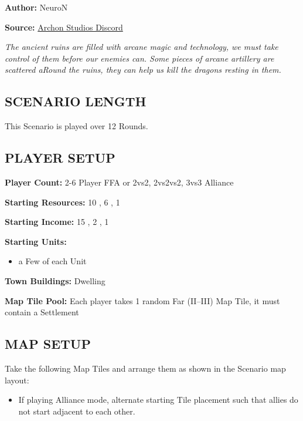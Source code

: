 
\begin{multicols}{2}

\textbf{Author:} NeuroN

\textbf{Source:} \href{https://discord.com/channels/740870068178649108/1279029213839626313}{Archon Studios Discord}

\textit{The ancient ruins are filled with arcane magic and technology, we must take control of them before our enemies can.
Some pieces of arcane artillery are scattered aRound the ruins, they can help us kill the dragons resting in them.}

\subsection*{\MakeUppercase{Scenario Length}}
This Scenario is played over 12 Rounds.

\subsection*{\MakeUppercase{Player Setup}}
\textbf{Player Count:} 2-6 Player FFA or 2vs2, 2vs2vs2, 3vs3 Alliance

\textbf{Starting Resources:} 10 , 6 , 1 

\textbf{Starting Income:} 15 , 2 , 1 

\textbf{Starting Units:}
\begin{itemize}
  \item a Few of each  Unit
\end{itemize}

\textbf{Town Buildings:}  Dwelling

\textbf{Map Tile Pool:} Each player takes 1 random Far (II--III) Map Tile, it must contain a Settlement

\subsection*{\MakeUppercase{Map Setup}}
Take the following Map Tiles and arrange them as shown in the Scenario map layout:

\begin{itemize}
  \item If playing Alliance mode, alternate starting Tile placement such that allies do not start adjacent to each other.
\end{itemize}


\end{multicols}
